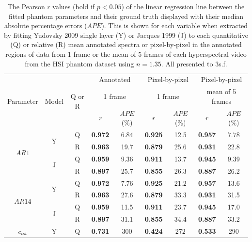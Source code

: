 \begin{table}[h!]
    \centering
    \caption{The Pearson $r$ values (bold if $p<0.05$) of the linear regression line between the fitted phantom parameters and their ground truth displayed with their median absolute percentage errors ($APE$). This is shown for each variable when extracted by fitting Yudovsky 2009 single layer (Y) or Jacques 1999 (J) to each quantitative (Q) or relative (R) mean annotated spectra or pixel-by-pixel in the annotated regions of data from 1 frame or the mean of 5 frames of each hyperspectral video from the HSI phantom dataset using $n=1.35$. All presented to 3s.f.}
    \begin{tabular}{|ccc|cc|cc|cc|}
        \hline
       \multirow{3}{*}{Parameter} & \multirow{3}{*}{Model} & \multirow{3}{*}{Q or R} & \multicolumn{2}{c|}{Annotated} & \multicolumn{2}{c|}{Pixel-by-pixel} & \multicolumn{2}{c|}{Pixel-by-pixel} \\
        & & & \multicolumn{2}{c|}{1 frame} & \multicolumn{2}{c|}{1 frame} & \multicolumn{2}{c|}{mean of 5 frames} \\
        & & & $r$ & $APE$ (\%) & $r$ & $APE$ (\%) & $r$ & $APE$ (\%) \\
        \hline
        \multirow{4}{*}{$AR1$} & \multirow{2}{*}{Y} & Q & \textbf{0.972} & 6.84 & \textbf{0.925} & 12.5 & \textbf{0.957} & 7.78 \\
        & & R & \textbf{0.963} & 19.7 & \textbf{0.879} & 25.6 & \textbf{0.931} & 22.8 \\
        \cline{2-9}
        & \multirow{2}{*}{J} & Q & \textbf{0.959} & 9.36 & \textbf{0.911} & 13.7 & \textbf{0.945} & 9.39 \\
        & & R & \textbf{0.897} & 25.7 & \textbf{0.855} & 26.3 & \textbf{0.887} & 26.2 \\
        \hline
        \multirow{4}{*}{$AR14$} & \multirow{2}{*}{Y} & Q & \textbf{0.972} & 7.76 & \textbf{0.925} & 21.2 & \textbf{0.957} & 13.6 \\
        & & R & \textbf{0.963} & 27.6 & \textbf{0.879} & 33.3 & \textbf{0.931} & 31.5 \\
        \cline{2-9}
        & \multirow{2}{*}{J} & Q & \textbf{0.959} & 11.5 & \textbf{0.911} & 23.7 & \textbf{0.945} & 17.0 \\
        & & R & \textbf{0.897} & 31.1 & \textbf{0.855} & 34.4 & \textbf{0.887} & 33.2 \\
        \hline
        \multirow{4}{*}{$c_{tot}$} & \multirow{2}{*}{Y} & Q & \textbf{0.731} & 300 & \textbf{0.424} & 272 & \textbf{0.533} & 290 \\

\end{tabular}
\end{table}
